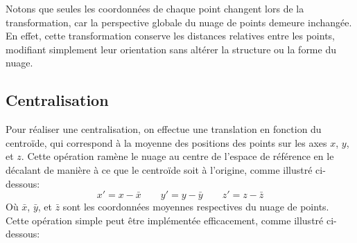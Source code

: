 \documentclass[../5RO17_TP4.tex]{subfiles}
\begin{document}
\begin{remark}
    Notons que seules les coordonnées de chaque point changent lors de la transformation, car la perspective globale du nuage de points demeure inchangée.\\
    
    \noindent En effet, cette transformation conserve les distances relatives entre les points, modifiant simplement leur orientation sans altérer la structure ou la forme du nuage.
\end{remark}


\subsection{Centralisation}
\noindent Pour réaliser une centralisation, on effectue une translation en fonction du centroïde, qui correspond à la moyenne des positions des points sur les axes $x$, $y$, et $z$. Cette opération ramène le nuage au centre de l'espace de référence en le décalant de manière à ce que le centroïde soit à l'origine, comme illustré ci-dessous:
\begin{equation}
    x' = x - \bar{x}
    \qquad
    y' = y - \bar{y}
    \qquad
    z' = z - \bar{z}
\end{equation}
\noindent Où $\bar{x}$, $\bar{y}$, et $\bar{z}$ sont les coordonnées moyennes respectives du nuage de points. Cette opération simple peut être implémentée efficacement, comme illustré ci-dessous:\\
\end{document}

